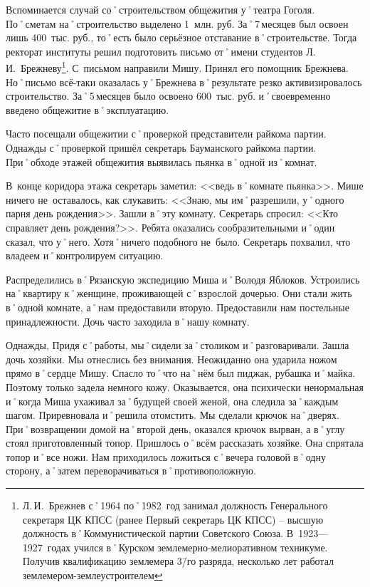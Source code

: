 Вспоминается случай со˚строительством общежития у˚театра Гоголя. По˚сметам на˚строительство выделено 1~млн. руб. За˚7\,месяцев был освоен лишь 400~тыс. руб., то˚есть было серьёзное отставание в˚строительстве. Тогда ректорат институты решил подготовить письмо от˚имени студентов Л.\,И.~Брежневу\footnote{Л.\,И.~Брежнев с˚1964 по˚1982~год занимал должность Генерального секретаря ЦК КПСС (ранее Первый секретарь ЦК КПСС) \--- высшую должность в˚Коммунистической партии Советского Союза. В~1923—1927~годах учился в˚Курском землемерно-мелиоративном техникуме. Получив квалификацию землемера 3\=/го разряда, несколько лет работал землемером-землеустроителем}. С~письмом направили Мишу. Принял его помощник Брежнева. Но˚письмо всё-таки оказалась у˚Брежнева в˚результате резко активизировалось строительство. За˚5\,месяцев было освоено 600~тыс. руб. и˚своевременно введено общежитие в˚эксплуатацию.

Часто посещали общежитии с˚проверкой представители райкома партии. Однажды с˚проверкой пришёл секретарь Бауманского райкома партии. При˚обходе этажей общежития выявилась пьянка в˚одной из˚комнат. 

В~конце коридора этажа секретарь заметил: <<ведь в˚комнате пьянка>>. Мише ничего не~оставалось, как слукавить: <<Знаю, мы им˚разрешили, у˚одного парня день рождения>>. Зашли в˚эту комнату. Секретарь спросил: <<Кто справляет день рождения?>>. Ребята оказались сообразительными и˚один сказал, что у˚него. Хотя˚ничего подобного не~было. Секретарь похвалил, что владеем и˚контролируем ситуацию.

Распределились в˚Рязанскую экспедицию Миша и˚Володя Яблоков. Устроились на˚квартиру к˚женщине, проживающей с˚взрослой дочерью. Они стали жить в˚одной комнате, а˚нам предоставили вторую. Предоставили нам постельные принадлежности. Дочь часто заходила в˚нашу комнату.

Однажды, Придя с˚работы, мы˚сидели за˚столиком и˚разговаривали. Зашла дочь хозяйки. Мы отнеслись без внимания. Неожиданно она ударила ножом прямо в˚сердце Мишу. Спасло то˚что на˚нём был пиджак, рубашка и˚майка. Поэтому только задела немного кожу. Оказывается, она психически ненормальная и˚когда Миша ухаживал за˚будущей своей женой, она следила за˚каждым шагом. Приревновала и˚решила отомстить. Мы сделали крючок на˚дверях. При˚возвращении домой на˚второй день, оказался крючок вырван, а в˚углу стоял приготовленный топор. Пришлось о˚всём рассказать хозяйке. Она спрятала топор и˚все ножи. Нам приходилось ложиться с˚вечера головой в˚одну сторону, а˚затем переворачиваться в˚противоположную.

